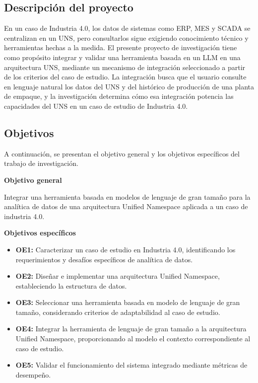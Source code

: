 \subsection*{\centering Descripción del proyecto}
En un caso de Industria 4.0, los datos de sistemas como ERP, MES y SCADA se centralizan en un UNS, pero consultarlos sigue exigiendo conocimiento técnico y herramientas hechas a la medida. El presente proyecto de investigación tiene como propósito integrar y validar una herramienta basada en un LLM en una arquitectura UNS, mediante un mecanismo de integración seleccionado a partir de los criterios del caso de estudio. La integración busca que el usuario consulte en lenguaje natural los datos del UNS y del histórico de producción de una planta de empaque, y la investigación determina cómo esa integración potencia las capacidades del UNS en un caso de estudio de Industria 4.0.


\subsection*{\centering Objetivos}
A continuación, se presentan el objetivo general y los objetivos específicos del trabajo de investigación.


\textbf{Objetivo general}

Integrar una herramienta basada en modelos de lenguaje de gran tamaño para la analítica de datos de una arquitectura Unified Namespace aplicada a un caso de industria 4.0.

\vspace{0.5cm}


\textbf{\centering Objetivos específicos}
\begin{itemize}
    \item \textbf{OE1:} Caracterizar un caso de estudio en Industria 4.0, identificando los requerimientos y desafíos específicos de analítica de datos.

    \item \textbf{OE2:} Diseñar e implementar una arquitectura Unified Namespace, estableciendo la estructura de datos.

    \item \textbf{OE3:} Seleccionar una herramienta basada en modelo de lenguaje de gran tamaño, considerando criterios de adaptabilidad al caso de estudio.

    \item \textbf{OE4:} Integrar la herramienta de lenguaje de gran tamaño a la arquitectura Unified Namespace, proporcionando al modelo el contexto correspondiente al caso de estudio.

    \item \textbf{OE5:} Validar el funcionamiento del sistema integrado mediante métricas de desempeño.

\end{itemize}

